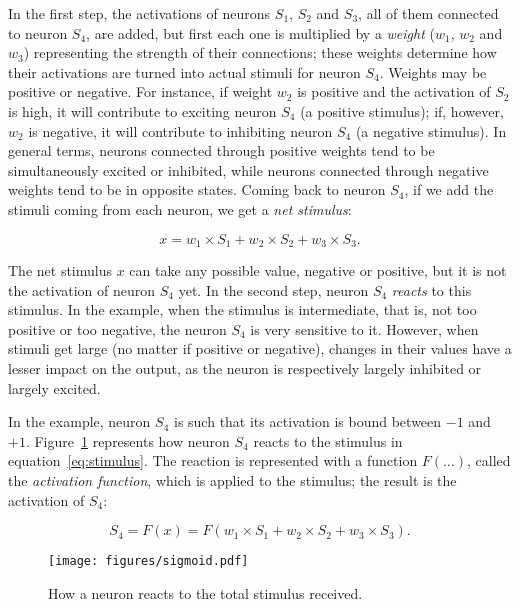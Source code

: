 \documentclass[output=paper,colorlinks,citecolor=brown]{langscibook}
\begin{document}
In the first step, the activations of neurons $S_1$, $S_2$ and $S_3$, all of them connected to neuron $S_4$, are added, but first each one is multiplied by a \emph{weight} ($w_1$, $w_2$ and $w_3$) representing the strength of their connections; these weights determine how their activations are turned into actual stimuli for neuron $S_4$. Weights may be positive or negative. For instance, if weight $w_2$ is positive and the activation of $S_2$ is high, it will contribute to exciting neuron $S_4$ (a positive stimulus); if, however, $w_2$ is negative, it will contribute to inhibiting neuron $S_4$ (a negative stimulus). In general terms, neurons connected through positive weights tend to be simultaneously excited or inhibited, while neurons connected through negative weights tend to be in opposite states. Coming back to neuron $S_4$, if we add the stimuli coming from each neuron, we get a \emph{net stimulus}:

\begin{equation}
    x = w_1\times S_1 + w_2\times S_2 + w_3\times S_3.
    \label{eq:stimulus}
\end{equation}

The net stimulus $x$
can take any possible value, negative or positive, but it is not the activation of neuron $S_4$ yet. In the second step, neuron $S_4$ \emph{reacts} to this stimulus. In the example, when the stimulus is intermediate, that is, not too positive or too negative, the neuron $S_4$ is very sensitive to it. However, when stimuli get large (no matter if positive or negative), changes in their values have a lesser impact on the output, as the neuron is respectively largely inhibited or largely excited. 

In the example, 
neuron $S_4$ 
is such that its activation
is bound between $-1$ and $+1$. Figure~\ref{fg:sigmoid} represents how neuron $S_4$ reacts to the stimulus in equation~\ref{eq:stimulus}. The reaction is represented with a function $F(\ldots)$, called the \emph{activation function}, which is applied to the stimulus; the result is the activation of $S_4$:

\begin{equation}
    S_4=F(x)=F(w_1\times S_1 + w_2\times S_2 + w_3\times S_3).
\end{equation}

\begin{figure}
    \texttt{[image: figures/sigmoid.pdf]}
    \caption{How a neuron reacts to the total stimulus received.}
    \label{fg:sigmoid}
\end{figure}
\end{document}
